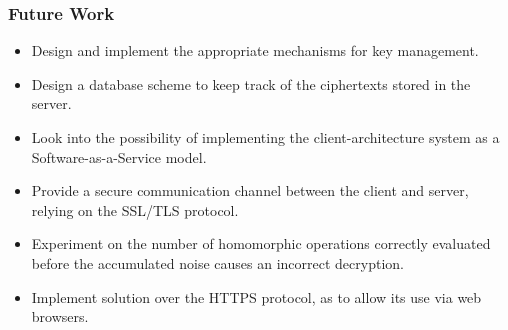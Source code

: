 \documentclass{beamer}
\begin{document}
\begin{frame}
\frametitle{Future Work}
\begin{itemize}
\item Design and implement the appropriate mechanisms for key management.
\item Design a database scheme to keep track of the ciphertexts stored in the server.
\item Look into the possibility of implementing the client-architecture system as a Software-as-a-Service model.
\item Provide a secure communication channel between the client and server, relying on the SSL/TLS protocol.
\item Experiment on the number of homomorphic operations correctly evaluated before the accumulated noise causes an incorrect decryption.
\item Implement solution over the HTTPS protocol, as to allow its use via web browsers.
\end{itemize}

\end{frame}



\end{document}
